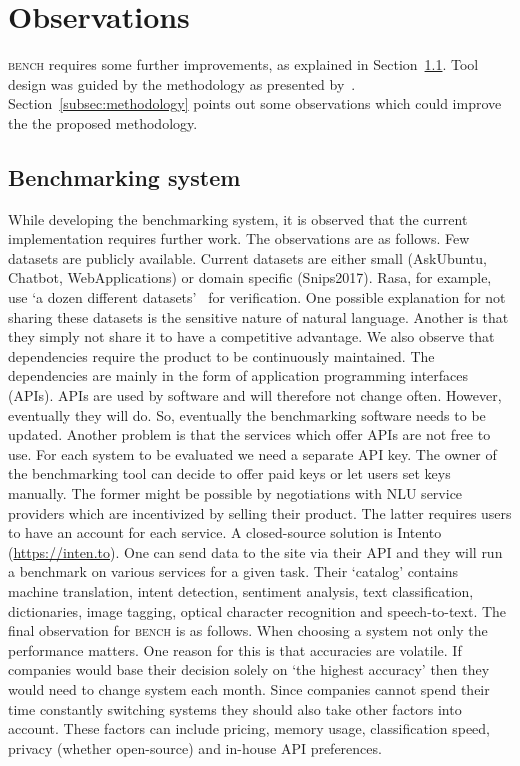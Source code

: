\section{Observations}
\label{sec:observations}

\textsc{bench} requires some further improvements, as explained in Section~\ref{subsec:benchmarking_system}.
Tool design was guided by the methodology as presented by~\citet{braun2017}.
Section~\ref{subsec:methodology} points out some observations which could improve the the proposed methodology.

\subsection{Benchmarking system}
\label{subsec:benchmarking_system}
While developing the benchmarking system, it is observed that the current implementation requires further work.
The observations are as follows.
Few datasets are publicly available.
Current datasets are either small (AskUbuntu, Chatbot, WebApplications) or domain specific (Snips2017).
Rasa, for example, use `a dozen different datasets'~\citep{nichol2018vectors} for verification.
One possible explanation for not sharing these datasets is the sensitive nature of natural language.
Another is that they simply not share it to have a competitive advantage.
We also observe that dependencies require the product to be continuously maintained.
The dependencies are mainly in the form of application programming interfaces (APIs).
APIs are used by software and will therefore not change often.
However, eventually they will do.
So, eventually the benchmarking software needs to be updated.
Another problem is that the services which offer APIs are not free to use.
For each system to be evaluated we need a separate API key.
The owner of the benchmarking tool can decide to offer paid keys or let users set keys manually.
The former might be possible by negotiations with NLU service providers which are incentivized by selling their product.
The latter requires users to have an account for each service.
A closed-source solution is Intento (\url{https://inten.to}).
One can send data to the site via their API and they will run a benchmark on various services for a given task.
Their `catalog' contains machine translation, intent detection, sentiment analysis, text classification, dictionaries, image tagging, optical character recognition and speech-to-text.
The final observation for \textsc{bench} is as follows.
When choosing a system not only the performance matters.
One reason for this is that accuracies are volatile.
If companies would base their decision solely on `the highest accuracy' then they would need to change system each month.
Since companies cannot spend their time constantly switching systems they should also take other factors into account.
These factors can include pricing, memory usage, classification speed, privacy (whether open-source) and in-house API preferences.

